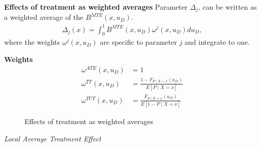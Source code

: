 \begin{frame}
	\textbf{Effects of treatment as weighted averages}
	Parameter \(\Delta_j\), can be written as a weighted average of the
	\(B^{MTE}(x, u_D)\).
	\begin{align*}
		\Delta_j(x) = \int_0^1 B^{MTE}(x, u_D) \omega^j(x, u_D) du_D,
	\end{align*}
	where the weights \(\omega^j(x, u_D)\) are specific to parameter \(j\)
	and integrate to one.
\end{frame}
\begin{frame}
	\textbf{Weights}
	\begin{align*}
		\omega^{ATE}(x, u_D) & = 1 \\
		\omega^{TT}(x, u_D) & = \frac{1 - F_{P\mid X=x}(u_D)}{E[P \mid X = x]}\\
		\omega^{TUT}(x, u_D) & = \frac{F_{P\mid X=x}(u_D)}{E[1 - P \mid X = x]}
	\end{align*}
\end{frame}
\begin{frame}
	\begin{figure}\caption{Effects of treatment as weighted averages}
	\end{figure}
\end{frame}
\begin{frame}\begin{center}
		\LARGE\textit{Local Average Treatment Effect}
\end{center}\end{frame}
